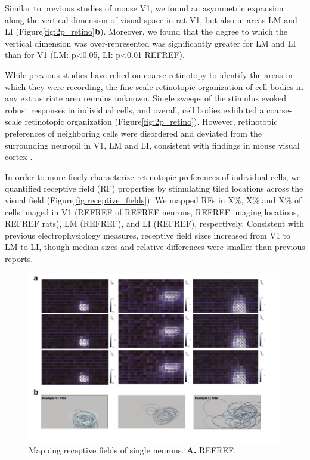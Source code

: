 Similar to previous studies of mouse V1, we found an asymmetric expansion along the vertical dimension of visual space in rat V1, but also in areas LM and LI (Figure\ref{fig:2p_retino}\textbf{b}). Moreover, we found that the degree to which the vertical dimension was over-represented was significantly greater for LM and LI than for V1 (LM: p<0.05, LI: p<0.01 REFREF).

While previous studies have relied on coarse retinotopy to identify the areas in which they were recording, the fine-scale retinotopic organization of cell bodies in any extrastriate area remains unknown. Single sweeps of the stimulus evoked robust responses in individual cells, and overall, cell bodies exhibited a coarse-scale retinotopic organization (Figure\ref{fig:2p_retino}). However, retinotopic preferences of neighboring cells were disordered and deviated from the surrounding neuropil in V1, LM and LI, consistent with findings in mouse visual cortex \cite{Liang2018, Andermann2011, Marques2018}. 

In order to more finely characterize retinotopic preferences of individual cells, we quantified receptive field (RF) properties by stimulating tiled locations across the visual field (Figure\ref{fig:receptive_fields}). We mapped RFs in X\%, X\% and X\% of cells imaged in V1 (REFREF of REFREF neurons, REFREF imaging locations, REFREF rats), LM (REFREF), and LI (REFREF), respectively. Consistent with previous electrophysiology measures\cite{Vermaercke2014, Tafazoli2017}, receptive field sizes increased from V1 to LM to LI, though median sizes and relative differences were smaller than previous reports. 

\begin{figure}[t!]
    \includegraphics[width=\textwidth]{figures/chapter_3/rf_examples/rf_examples.pdf}
    \vspace{.1in}
    \caption[Receptive field mapping]{Mapping receptive fields of single neurons. \textbf{A.} REFREF.
    \label{fig:rf_examples}}
\end{figure}

